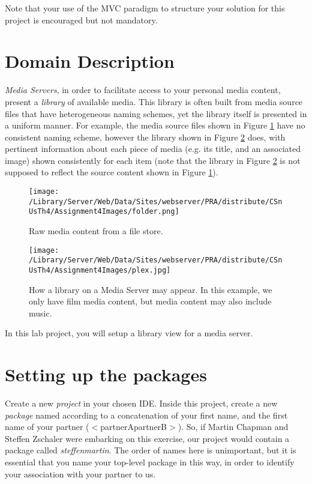 \documentclass[11pt]{article}
\begin{document}
Note that your use of the MVC paradigm to structure your solution for this project is encouraged but not mandatory.

\section{Domain Description}
\label{sec:domain}

\emph{Media Servers}, in order to facilitate access to your personal media content, present a \emph{library} of available media. This library is often built from media source files that have heterogeneous naming schemes, yet the library itself is presented in a uniform manner. For example, the media source files shown in Figure \ref{fig:folder} have no consistent naming scheme, however the library shown in Figure \ref{fig:library} does, with pertinent information about each piece of media (e.g. its title, and an associated image) shown consistently for each item (note that the library in Figure \ref{fig:library} is not supposed to reflect the source content shown in Figure \ref{fig:folder}).

\begin{figure}[htbp]
\begin{center}
\texttt{[image: /Library/Server/Web/Data/Sites/webserver/PRA/distribute/CSnUsTh4/Assignment4Images/folder.png]}
\caption{Raw media content from a file store.}
\label{fig:folder}
\end{center}
\end{figure}

\begin{figure}[htbp]
\begin{center}
\texttt{[image: /Library/Server/Web/Data/Sites/webserver/PRA/distribute/CSnUsTh4/Assignment4Images/plex.jpg]}
\caption{How a library on a Media Server may appear. In this example, we only have film media content, but media content may also include music.}
\label{fig:library}
\end{center}
\end{figure}

In this lab project, you will setup a library view for a media server.

\section{Setting up the packages}

Create a new \emph{project} in your chosen IDE. Inside this project, create a new \emph{package} named according to a concatenation of your first name, and the first name of your partner ($<$partnerApartnerB$>$). So, if Martin Chapman and Steffen Zschaler were embarking on this exercise, our project would contain a package called \emph{steffenmartin}. The order of names here is unimportant, but it is essential that you name your top-level package in this way, in order to identify your association with your partner to us.
\end{document}
